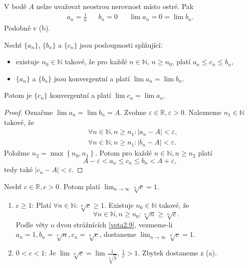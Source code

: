 \begin{poznamka}
	V bodě $A$ nelze uvažovat neostrou nerovnost místo ostré. Pak
	\begin{align*}
		a_n = \frac{1}{n} && b_n = 0 && \lim a_n=0=\lim b_n.
\end{align*}
Podobně v (b).
\end{poznamka}

\begin{veta} \label{veta2.9}
Nechť $\{a_n\}$, $\{b_n\}$ a $\{c_n\}$ jsou posloupnosti splňující:
\begin{itemize}
  \item[(a)] existuje $n_0 \in \mathbb{N}$ takové, že pro každé $n \in \mathbb{N}$,
  $n \ge n_0$, platí $a_n \le c_n \le b_n$,
  \item[(b)] $\{a_n\}$ a $\{b_n\}$ jsou konvergentní a platí
  $\lim a_n = \lim b_n$.
\end{itemize}
Potom je $\{c_n\}$ konvergentní a platí
$\lim c_n = \lim a_n$.
\end{veta}

\begin{proof}
	Označme $\lim a_n = \lim b_n=A$. Zvolme $\varepsilon \in \mathbb R , \varepsilon > 0$. Nalezneme $n_1 \in \mathbb N $
	takové, že
	\begin{align*}
		&\forall n \in \mathbb N , n \geq n_1: |a_n-A| < \varepsilon,\\
		&\forall n \in \mathbb N , n \geq n_1: |b_n-A|< \varepsilon.
\end{align*}
    Položme $n_2 = \max \left \{ n_0, n_1 \right \} $. Potom pro každé $n \in \mathbb N , n \geq n_2$ platí
    $$
        A-\varepsilon < a_n \leq c_n \leq b_n < A+ \varepsilon,
    $$
    tedy také $|c_n-A|<\varepsilon$.
\end{proof}

\begin{priklad}
	Nechť $c \in \mathbb R , c > 0$. Potom platí $\lim_{n \to \infty} \sqrt[n]{c}=1$.
	\begin{enumerate}[(1)]
		\item $c\geq 1$: Platí $\forall n \in \mathbb N : \sqrt[n]{c} \geq 1$. Existuje $n_0 \in \mathbb N $ takové, že
		$$
		    \forall n \in \mathbb N , n \geq n_0: \sqrt[n]{n} \geq \sqrt[n]{c}.
		$$
		Podle věty o dvou strážnících \ref{veta2.9}, vezmeme-li $a_n = 1, b_n = \sqrt[n]{n}, c_n = \sqrt[n]{c}$,
		dostaneme $\lim_{n \to \infty} \sqrt[n]{c}=1$.
		\item $0<c<1$: Je $\lim \sqrt[n]{c} = \lim \frac{1}{\sqrt[n]{\frac{1}{c}}}$, $\frac{1}{c}>1$. Zbytek dostaneme z (a).
\end{enumerate}
\end{priklad}

